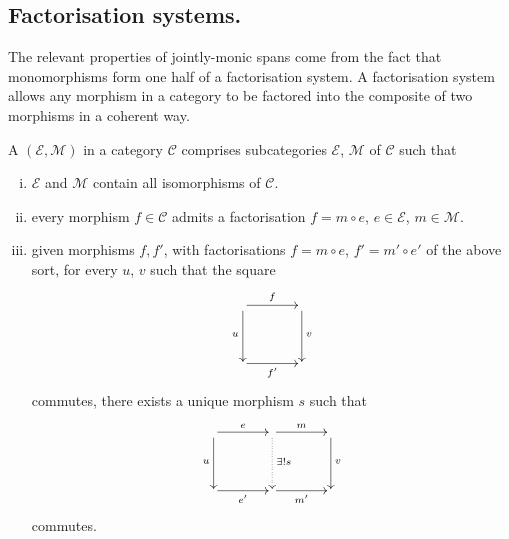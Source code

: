 \subsection{Factorisation systems.}
The relevant properties of jointly-monic spans come from the fact that
monomorphisms form one half of a factorisation system. A factorisation system
allows any morphism in a category to be factored into the composite of two
morphisms in a coherent way.

\begin{definition}
  A  $(\mathcal E,\mathcal M)$ in a category
  $\mathcal C$ comprises subcategories $\mathcal E$, $\mathcal M$ of $\mathcal
  C$ such that
  \begin{enumerate}[(i)]
    \item $\mathcal E$ and $\mathcal M$ contain all isomorphisms of $\mathcal
      C$.
    \item  every morphism $f \in \mathcal C$ admits a factorisation $f=m \circ
      e$, $e \in \mathcal E$, $m \in \mathcal M$.
\item given morphisms $f,f'$, with factorisations $f = m \circ e$, $f' = m' \circ
  e'$ of the above sort, for every $u$, $v$ such that the square
  \[
    \xymatrixcolsep{3pc}
    \xymatrixrowsep{3pc}
    \xymatrix{
       \ar[r]^f \ar[d]_u &  \ar[d]^v \\
       \ar[r]_{f'} & 
    }
  \]
  commutes, there exists a unique morphism $s$ such that
  \[
    \xymatrixcolsep{3pc}
    \xymatrixrowsep{3pc}
    \xymatrix{
      \ar[r]^e \ar[d]_u & \ar[r]^m \ar@{.>}[d]^{\exists! s} &  \ar[d]^v \\
       \ar[r]_{e'}& \ar[r]_{m'} & 
    }
  \]
  commutes.
  \end{enumerate}
\end{definition}

